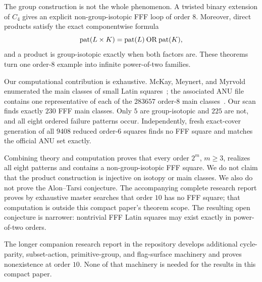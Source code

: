 The group construction is not the whole phenomenon.  A twisted binary
extension of $C_4$ gives an explicit non-group-isotopic FFF loop of order $8$.
Moreover, direct products satisfy the exact componentwise formula
\[
  \operatorname{pat}(L\times K)=\operatorname{pat}(L)\mathbin{\mathrm{OR}}\operatorname{pat}(K),
\]
and a product is group-isotopic exactly when both factors are.  These theorems
turn one order-$8$ example into infinite power-of-two families.

Our computational contribution is exhaustive.  McKay, Meynert, and Myrvold
enumerated the main classes of small Latin squares~\cite{McKayMeynertMyrvold2007};
the associated ANU file contains one representative of each of the $283657$
order-$8$ main classes~\cite{McKayLatinData}.  Our scan finds exactly $230$
FFF main classes.  Only $5$ are group-isotopic and $225$ are not, and all
eight ordered failure patterns occur.  Independently, fresh exact-cover
generation of all $9408$ reduced order-$6$ squares finds no FFF square and
matches the official ANU set exactly.

Combining theory and computation proves that every order $2^m$, $m\geq3$,
realizes all eight patterns and contains a non-group-isotopic FFF square.  We
do not claim that the product construction is injective on isotopy or main
classes.  We also do not prove the Alon--Tarsi conjecture.  The accompanying
complete research report proves by exhaustive master searches that order $10$
has no FFF square; that computation is outside this compact paper's theorem
scope.  The resulting open conjecture is narrower: nontrivial FFF Latin
squares may exist exactly in power-of-two orders.

The longer companion research report in the repository develops additional
cycle-parity, subset-action, primitive-group, and flag-surface machinery
and proves nonexistence at order $10$.  None of that machinery is needed for
the results in this compact paper.
